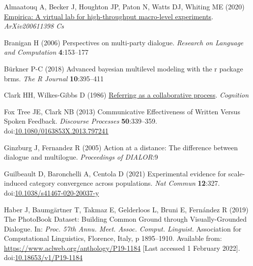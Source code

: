 \documentclass[
  english,
  a4paper,
]{article}
\newlength{\cslhangindent}
\newlength{\cslentryspacingunit} %
\newenvironment{CSLReferences}[2] %
 {%
  \setlength{\parindent}{0pt}
  \ifodd #1
  \let\oldpar\par
  \def\par{\hangindent=\cslhangindent\oldpar}
  \fi
  \setlength{\parskip}{#2\cslentryspacingunit}
 }%
 {}
\begin{document}
\hypertarget{refs}{}
\begin{CSLReferences}{1}{0}
\leavevmode{}%
Almaatouq A, Becker J, Houghton JP, Paton N, Watts DJ, Whiting ME (2020) \href{http://arxiv.org/abs/2006.11398}{Empirica: A virtual lab for high-throughput macro-level experiments}. \emph{ArXiv200611398 Cs}

\leavevmode{}%
Branigan H (2006) Perspectives on multi-party dialogue. \emph{Research on Language and Computation} \textbf{4}:153--177

\leavevmode{}%
Bürkner P-C (2018) Advanced bayesian multilevel modeling with the r package brms. \emph{The R Journal} \textbf{10}:395--411

\leavevmode{}%
Clark HH, Wilkes-Gibbs D (1986) \href{http://www.speech.kth.se/~edlund/bielefeld/references/clark-and-wilkes-gibbs-1986.pdf}{Referring as a collaborative process}. \emph{Cognition}

\leavevmode{}%
Fox Tree JE, Clark NB (2013) Communicative {Effectiveness} of {Written Versus Spoken Feedback}. \emph{Discourse Processes} \textbf{50}:339--359. doi:\href{https://doi.org/10.1080/0163853X.2013.797241}{10.1080/0163853X.2013.797241}

\leavevmode{}%
Ginzburg J, Fernandez R (2005) Action at a distance: The difference between dialogue and multilogue. \emph{Proceedings of DIALOR}:9

\leavevmode{}%
Guilbeault D, Baronchelli A, Centola D (2021) Experimental evidence for scale-induced category convergence across populations. \emph{Nat Commun} \textbf{12}:327. doi:\href{https://doi.org/10.1038/s41467-020-20037-y}{10.1038/s41467-020-20037-y}

\leavevmode{}%
Haber J, Baumgärtner T, Takmaz E, Gelderloos L, Bruni E, Fernández R (2019) The {PhotoBook Dataset}: {Building Common Ground} through {Visually-Grounded Dialogue}. In: \emph{Proc. 57th {Annu}. {Meet}. {Assoc}. {Comput}. {Linguist}.} {Association for Computational Linguistics}, {Florence, Italy}, p 1895--1910. Available from: \url{https://www.aclweb.org/anthology/P19-1184} {[}Last accessed 1 February 2022{]}. doi:\href{https://doi.org/10.18653/v1/P19-1184}{10.18653/v1/P19-1184}


\end{CSLReferences}
\end{document}
